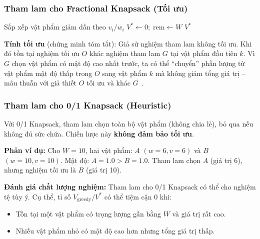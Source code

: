 \documentclass[fontsize=13pt,a4paper]{report}
\begin{document}
\subsubsection*{Tham lam cho Fractional Knapsack (Tối ưu)}

\begin{algorithm}[H]
\caption{Tham lam cho Fractional Knapsack}
\label{alg:greedy_frac}
Sắp xếp vật phẩm giảm dần theo $v_i / w_i$\;
$V^* \leftarrow 0;\; \text{rem} \leftarrow W$\;
\Return $V^*$\;
\end{algorithm}

\textbf{Tính tối ưu} (chứng minh tóm tắt): Giả sử nghiệm tham lam không tối ưu. Khi đó tồn tại nghiệm tối ưu $O$ khác nghiệm tham lam $G$ tại vật phẩm đầu tiên $k$. Vì $G$ chọn vật phẩm có mật độ cao nhất trước, ta có thể ``chuyển'' phần lượng từ vật phẩm mật độ thấp trong $O$ sang vật phẩm $k$ mà không giảm tổng giá trị -- mâu thuẫn với giả thiết $O$ tối ưu và khác $G$~\cite{dantzig1957discrete}.

\subsubsection*{Tham lam cho 0/1 Knapsack (Heuristic)}

Với 0/1 Knapsack, tham lam chọn toàn bộ vật phẩm (không chia lẻ), bỏ qua nếu không đủ sức chứa. Chiến lược này \textbf{không đảm bảo tối ưu}.

\textbf{Phản ví dụ:} Cho $W = 10$, hai vật phẩm: $A$ $(w=6, v=6)$ và $B$ $(w=10, v=10)$. Mật độ: $A = 1.0 > B = 1.0$. Tham lam chọn $A$ (giá trị 6), nhưng nghiệm tối ưu là $B$ (giá trị 10).

\textbf{Đánh giá chất lượng nghiệm:} Tham lam cho 0/1 Knapsack có thể cho nghiệm tệ tùy ý. Cụ thể, tỉ số $V_{\text{greedy}} / V^*$ có thể tiệm cận $0$ khi:
\begin{itemize}[noitemsep]
    \item Tồn tại một vật phẩm có trọng lượng gần bằng $W$ và giá trị rất cao.
    \item Nhiều vật phẩm nhỏ có mật độ cao hơn nhưng tổng giá trị thấp.
\end{itemize}
\end{document}
